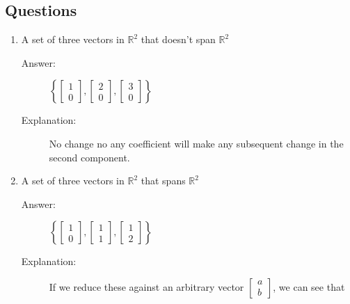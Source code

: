 \documentclass{article}
\begin{document}
            \subsection{Questions}
                \renewcommand{\labelenumi}{\alph{enumi}}
                    \begin{enumerate}
                        \item 
                            A set of three vectors in $\mathbb{R}^2$ that doesn't span $\mathbb{R}^2$
                            \begin{description}
                                \item[Answer:] 
                                    $\left\{\begin{bmatrix}1 \\ 0\end{bmatrix}, \begin{bmatrix}2 \\ 0\end{bmatrix}, \begin{bmatrix}3 \\ 0\end{bmatrix}\right\}$
                                \item[Explanation:]
                                    No change no any coefficient will make any subsequent change in the second component.
                            \end{description}
                        \item 
                            A set of three vectors in $\mathbb{R}^2$ that spans $\mathbb{R}^2$
                            \begin{description}
                                \item[Answer:] 
                                    $\left\{\begin{bmatrix}1 \\ 0\end{bmatrix}, \begin{bmatrix}1 \\ 1\end{bmatrix}, \begin{bmatrix}1 \\ 2\end{bmatrix}\right\}$ 
                                \item[Explanation:]
                                    If we reduce these against an arbitrary vector $\begin{bmatrix}a \\ b\end{bmatrix}$, we can see that

\end{description}
\end{enumerate}
\end{document}
